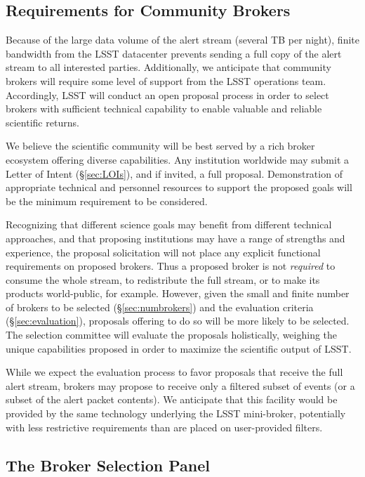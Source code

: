 \subsection{Requirements for Community Brokers}

Because of the large data volume of the alert stream (several TB per night), finite bandwidth from the LSST datacenter prevents sending a full copy of the alert stream to all interested parties.
Additionally, we anticipate that community brokers will require some level of support from the LSST operations team.
Accordingly, LSST will conduct an open proposal process in order to select brokers with sufficient technical capability to enable valuable and reliable scientific returns.

We believe the scientific community will be best served by a rich broker ecosystem offering diverse capabilities. 
Any institution worldwide may submit a Letter of Intent (\S \ref{sec:LOIs}), and if invited, a full proposal.
Demonstration of appropriate technical and personnel resources to support the proposed goals will be the minimum requirement to be considered.

Recognizing that different science goals may benefit from different technical approaches, and that proposing institutions may have a range of strengths and experience, the proposal solicitation will not place any explicit functional requirements on proposed brokers.  
Thus a proposed broker is not \textit{required} to consume the whole stream, to redistribute the full stream, or to make its products world-public, for example.
However, given the small and finite number of brokers to be selected (\S \ref{sec:numbrokers}) and the evaluation criteria (\S \ref{sec:evaluation}), proposals offering to do so will be more likely to be selected.
The selection committee will evaluate the proposals holistically, weighing the unique capabilities proposed in order to maximize the scientific output of LSST.

While we expect the evaluation process to favor proposals that receive the full alert stream, brokers may propose to receive only a filtered subset of events (or a subset of the alert packet contents).  
We anticipate that this facility would be provided by the same technology underlying the LSST mini-broker, potentially with less restrictive requirements than are placed on user-provided filters. 

\subsection{The Broker Selection Panel}

